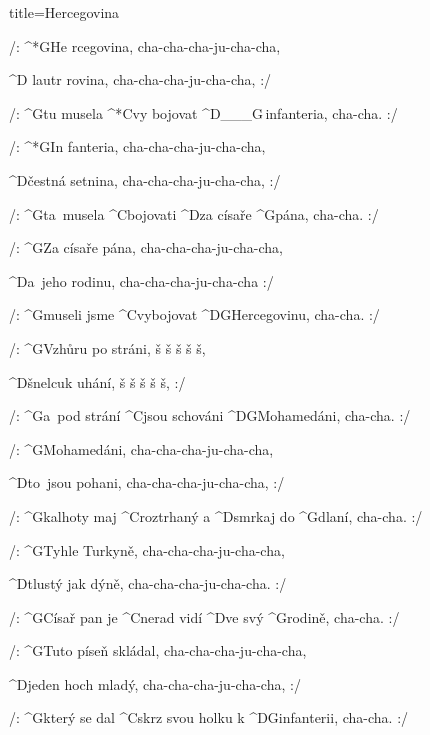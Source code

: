 \begin{song}{title=\predtitle\centering Hercegovina \\\large \vspace*{-0.3cm}}  %
\nejnejvetsi

\begin{centerjustified}

\sloka
	/: ^*{G}He  rcegovina, cha-cha-cha-ju-cha-cha,
	
	^{D\,\,}lautr rovina, cha-cha-cha-ju-cha-cha, :/
	
	/: ^{G}tu musela ^*{C}vy bojovat ^{D{\color{white}\_\_\_}G\,}infanteria, cha-cha. :/
	
\sloka
	/: ^*{G}In fanteria, cha-cha-cha-ju-cha-cha,
	
	^{D\z}čestná setnina, cha-cha-cha-ju-cha-cha, :/
	
	/: ^{G\z}ta~musela ^{C\z}bojovati ^{D}za císaře ^{\z G}pána, cha-cha. :/
	
\sloka
	/: ^{G\z}Za císaře pána, cha-cha-cha-ju-cha-cha,
	
	^{D\z}a~jeho rodinu, cha-cha-cha-ju-cha-cha :/
	
	/: ^{G\z}museli jsme ^{C\z}vybojovat ^{D\z G}Hercegovinu, cha-cha. :/
	
\sloka
	/: ^{G\z}Vzhůru po stráni, š š š š š,
	
	^{D\z}šnelcuk uhání, š š š š š, :/
	
	/: ^{G\z}a~pod strání ^{C\z}jsou schováni ^{D\z G}Mohamedáni, cha-cha. :/

\end{centerjustified}
\newpage
\begin{centerjustified}
\sloka
	/: ^{G\z}Mohamedáni, cha-cha-cha-ju-cha-cha,
	
	^{D\z}to~jsou pohani, cha-cha-cha-ju-cha-cha, :/
	
	/: ^{G\z}kalhoty maj ^{C\z}roztrhaný a ^{D\z}smrkaj do ^{\z G}dlaní, cha-cha. :/
	
\sloka
	/: ^{G\z}Tyhle Turkyně, cha-cha-cha-ju-cha-cha,
	
	^{D\z}tlustý jak dýně, cha-cha-cha-ju-cha-cha. :/
	
	/: ^{G\z}Císař pan je ^{C\z}nerad vidí ^{D\z}ve svý ^{\z G}rodině, cha-cha. :/
	
\sloka
	/: ^{G\z}Tuto píseň skládal, cha-cha-cha-ju-cha-cha,
	
	^{D\z}jeden hoch mladý, cha-cha-cha-ju-cha-cha, :/
	
	/: ^{G\z}který se dal ^{C\z}skrz svou holku k ^{D\z G}infanterii, cha-cha. :/
	

\end{centerjustified}
\setcounter{Slokočet}{0}
\end{song}


